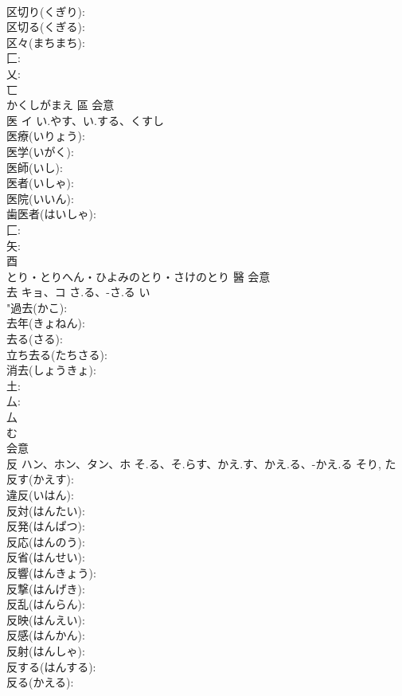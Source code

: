 \documentclass[8pt]{extreport}
\begin{document}
\begin{CJK}{UTF8}{min}
\\	区切り(くぎり): 
\\	区切る(くぎる): 
\\	区々(まちまち): 
\\	匚: 
\\	乂: 
\\	匸	
\\	かくしがまえ	區	会意 
\\	医	イ	い.やす、い.する、くすし		
\\	医療(いりょう): 
\\	医学(いがく): 
\\	医師(いし): 
\\	医者(いしゃ): 
\\	医院(いいん): 
\\	歯医者(はいしゃ): 
\\	匚: 
\\	矢: 
\\	酉	
\\	とり・とりへん・ひよみのとり・さけのとり	醫	会意 
\\	去	キョ、コ	さ.る、-さ.る	い	
\\	"過去(かこ): 
\\	去年(きょねん): 
\\	去る(さる): 
\\	立ち去る(たちさる): 
\\	消去(しょうきょ): 
\\	土: 
\\	厶: 
\\	厶	
\\	む	
\\	会意 
\\	反	ハン、ホン、タン、ホ	そ.る、そ.らす、かえ.す、かえ.る、-かえ.る	そり, た	
\\	反す(かえす): 
\\	違反(いはん): 
\\	反対(はんたい): 
\\	反発(はんぱつ): 
\\	反応(はんのう): 
\\	反省(はんせい): 
\\	反響(はんきょう): 
\\	反撃(はんげき): 
\\	反乱(はんらん): 
\\	反映(はんえい): 
\\	反感(はんかん): 
\\	反射(はんしゃ): 
\\	反する(はんする): 
\\	反る(かえる): 

\end{CJK}
\end{document}
